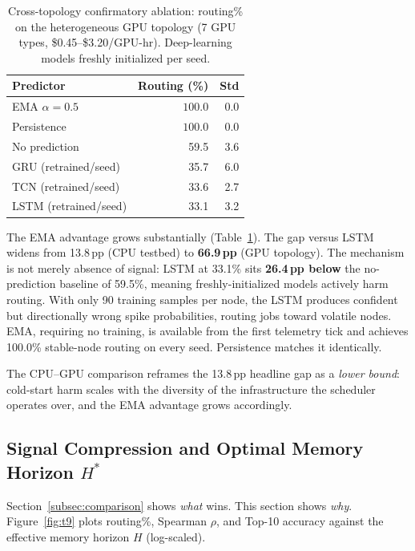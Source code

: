 \documentclass[conference]{IEEEtran}
\begin{document}
\begin{table}[t]
\caption{Cross-topology confirmatory ablation: routing\% on the
heterogeneous GPU topology (7 GPU types, \$0.45--\$3.20/GPU-hr).
Deep-learning models freshly initialized per seed.}
\label{tab:gpu_confirm}
\begin{center}
\begin{tabular}{lrr}
\toprule
\textbf{Predictor} & \textbf{Routing (\%)} & \textbf{Std} \\
\midrule
EMA $\alpha{=}0.5$    & $\mathbf{100.0}$ & 0.0 \\
Persistence            & $\mathbf{100.0}$ & 0.0 \\
No prediction          &            59.5  & 3.6 \\
GRU (retrained/seed)   &            35.7  & 6.0 \\
TCN (retrained/seed)   &            33.6  & 2.7 \\
LSTM (retrained/seed)  &            33.1  & 3.2 \\
\bottomrule
\end{tabular}
\end{center}
\end{table}

The EMA advantage grows substantially (Table~\ref{tab:gpu_confirm}). The
gap versus LSTM widens from 13.8\,pp (CPU testbed) to \textbf{66.9\,pp}
(GPU topology). The mechanism is not merely absence of signal: LSTM at
33.1\% sits \textbf{26.4\,pp below} the no-prediction baseline of 59.5\%,
meaning freshly-initialized models actively harm routing. With only 90
training samples per node, the LSTM produces confident but directionally
wrong spike probabilities, routing jobs toward volatile nodes. EMA, requiring
no training, is available from the first telemetry tick and achieves 100.0\%
stable-node routing on every seed. Persistence matches it identically.

The CPU--GPU comparison reframes the 13.8\,pp headline gap as a
\emph{lower bound}: cold-start harm scales with the diversity of the
infrastructure the scheduler operates over, and the EMA advantage grows
accordingly.

\subsection{Signal Compression and Optimal Memory Horizon $H^{*}$}
\label{subsec:hstar}

Section~\ref{subsec:comparison} shows \emph{what} wins. This section
shows \emph{why}. Figure~\ref{fig:t9} plots routing\%, Spearman $\rho$,
and Top-10 accuracy against the effective memory horizon $H$ (log-scaled).
\end{document}

